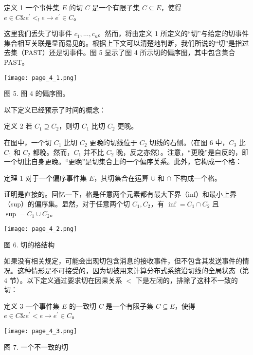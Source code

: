 \documentclass[12pt,a4paper]{report} %
\begin{document}
定义 1 一个事件集 $E$ 的切 $C$ 是一个有限子集 $C \subseteq E$，使得 $e \in C \& e^{\prime}<_{l} e \rightarrow e^{\prime} \in C$。

这里我们丢失了切事件 $c_{1}, \ldots, c_{n}$。然而，将由定义 1 所定义的“切”与给定的切事件集合相互关联是显而易见的。根据上下文可以清楚地判断，我们所说的“切”是指过去集（PAST）还是切事件。图 5 显示了图 4 所示切的偏序图，其中包含集合 PAST。

\begin{center}
\texttt{[image: page\_4\_1.png]}
\end{center}
\begin{center}
图 5. 图 4 的偏序图。
\end{center}

以下定义已经预示了时间的概念：

定义 2 若 $C_{1} \supseteq C_{2}$，则切 $C_{1}$ 比切 $C_{2}$ 更晚。

在图中，一个切 $C_{1}$ 比切 $C_{2}$ 更晚的切线位于 $C_{2}$ 切线的右侧。（在图 6 中，$C_{3}$ 比 $C_{1}$ 和 $C_{2}$ 都晚。然而，$C_{1}$ 并不比 $C_{2}$ 晚，反之亦然）。注意，“更晚”是自反的，即一个切比自身更晚。“更晚”是切集合上的一个偏序关系。此外，它构成一个格：

定理 1 对于一个偏序事件集 $E$，其切集合在运算 $\cup$ 和 $\cap$ 下构成一个格。

证明是直接的。回忆一下，格是任意两个元素都有最大下界（inf）和最小上界（sup）的偏序集。显然，对于任意两个切 $C_{1}, C_{2}$，有 $\inf = C_{1} \cap C_{2}$ 且 $\sup = C_{1} \cup C_{2}$。

\begin{center}
\texttt{[image: page\_4\_2.png]}
\end{center}
\begin{center}
图 6. 切的格结构
\end{center}

如果没有相关规定，可能会出现切包含消息的接收事件，但不包含其发送事件的情况。这种情形是不可接受的，因为切被用来计算分布式系统沿切线的全局状态（第 4 节）。以下定义通过要求切在因果关系 $<$ 下是左闭的，排除了这种不一致的切：

定义 3 一个事件集 $E$ 的一致切 $C$ 是一个有限子集 $C \subseteq E$，使得 $e \in C \& e^{\prime}<e \rightarrow e^{\prime} \in C$。

\begin{center}
\texttt{[image: page\_4\_3.png]}
\end{center}
\begin{center}
图 7. 一个不一致的切
\end{center}
\end{document}
